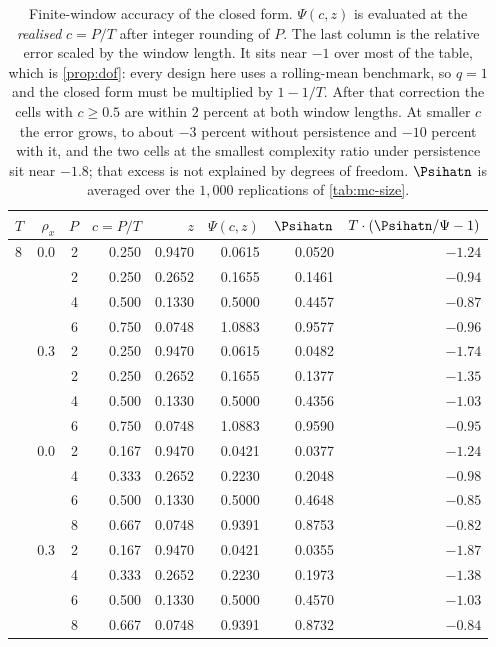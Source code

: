 \begin{table}[htbp]
\centering
\caption{Finite-window accuracy of the closed form. $\Psi(c,z)$ is evaluated at the \emph{realised} $c=P/T$ after integer rounding of $P$. The last column is the relative error scaled by the window length. It sits near $-1$ over most of the table, which is \cref{prop:dof}: every design here uses a rolling-mean benchmark, so $q=1$ and the closed form must be multiplied by $1-1/T$. After that correction the cells with $c\ge0.5$ are within $2$ percent at both window lengths. At smaller $c$ the error grows, to about $-3$ percent without persistence and $-10$ percent with it, and the two cells at the smallest complexity ratio under persistence sit near $-1.8$; that excess is not explained by degrees of freedom. $\Psihatn$ is averaged over the $1{,}000$ replications of \cref{tab:mc-size}.}
\label{tab:mc-closedform}
\small
\begin{tabular}{lrrrrrrr}
\toprule
$T$ & $\rho_x$ & $P$ & $c=P/T$ & $z$ & $\Psi(c,z)$ & $\Psihatn$ & $T\cdot(\Psihatn/\Psi-1)$ \\
\midrule
8 & 0.0 & 2 & 0.250 & 0.9470 & 0.0615 & 0.0520 & $-1.24$ \\
 &  & 2 & 0.250 & 0.2652 & 0.1655 & 0.1461 & $-0.94$ \\
 &  & 4 & 0.500 & 0.1330 & 0.5000 & 0.4457 & $-0.87$ \\
 &  & 6 & 0.750 & 0.0748 & 1.0883 & 0.9577 & $-0.96$ \\
\addlinespace
8 & 0.3 & 2 & 0.250 & 0.9470 & 0.0615 & 0.0482 & $-1.74$ \\
 &  & 2 & 0.250 & 0.2652 & 0.1655 & 0.1377 & $-1.35$ \\
 &  & 4 & 0.500 & 0.1330 & 0.5000 & 0.4356 & $-1.03$ \\
 &  & 6 & 0.750 & 0.0748 & 1.0883 & 0.9590 & $-0.95$ \\
\addlinespace
12 & 0.0 & 2 & 0.167 & 0.9470 & 0.0421 & 0.0377 & $-1.24$ \\
 &  & 4 & 0.333 & 0.2652 & 0.2230 & 0.2048 & $-0.98$ \\
 &  & 6 & 0.500 & 0.1330 & 0.5000 & 0.4648 & $-0.85$ \\
 &  & 8 & 0.667 & 0.0748 & 0.9391 & 0.8753 & $-0.82$ \\
\addlinespace
12 & 0.3 & 2 & 0.167 & 0.9470 & 0.0421 & 0.0355 & $-1.87$ \\
 &  & 4 & 0.333 & 0.2652 & 0.2230 & 0.1973 & $-1.38$ \\
 &  & 6 & 0.500 & 0.1330 & 0.5000 & 0.4570 & $-1.03$ \\
 &  & 8 & 0.667 & 0.0748 & 0.9391 & 0.8732 & $-0.84$ \\
\bottomrule
\end{tabular}
\end{table}
